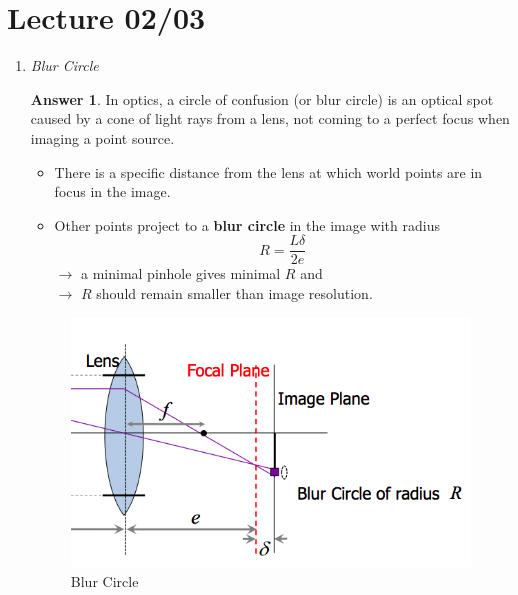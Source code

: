 \documentclass[a4paper,12 pt]{article}
\theoremstyle{definition}
\theoremstyle{remark}
\theoremstyle{definition}
\theoremstyle{definition}
\theoremstyle{definition}
\theoremstyle{definition}
\theoremstyle{remark}
\theoremstyle{remark}
\theoremstyle{definition}
\theoremstyle{definition}
\newtheorem*{answer}{Answer}
\begin{document}
\section*{Lecture 02/03}
\begin{enumerate}
\item \textit{Blur Circle}
\begin{answer}
In optics, a circle of confusion (or blur circle) is an optical spot caused by a cone of light rays from a lens, not coming to a perfect focus when imaging a point source. 
\begin{itemize}
\item There is a specific distance from the lens at which world points are in focus in the image.
\item Other points project to a \textbf{blur circle} in the image with radius
\begin{equation}
R=\frac{L\delta }{2e}
\end{equation}
$\rightarrow$ a minimal pinhole gives minimal $R$ and\\
$\rightarrow$ $R$ should remain smaller than image resolution.
\end{itemize}
\begin{figure}[h!]
\begin{center}
\includegraphics[scale=0.5]{pics/blur_circle}
\caption{Blur Circle  \label{fig:blurcircle}}
\end{center}
\end{figure}
\end{answer}


\end{enumerate}
\end{document}
